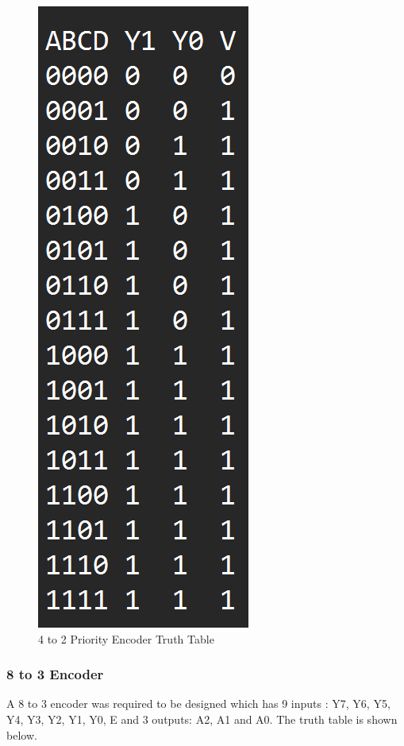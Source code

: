 \documentclass[12pt]{article}
\begin{document}
\begin{figure}[H]
\centering
  \includegraphics[scale=0.3]{Images/4to2PriorityTT.png}
  \caption{4 to 2 Priority Encoder Truth Table}
\end{figure}

\subsubsection{8 to 3 Encoder}
A 8 to 3 encoder was required to be designed which has 9 inputs : Y7, Y6, Y5, Y4, Y3, Y2, Y1, Y0, E and 3 outputs: A2, A1 and A0. The truth table is shown below.
\end{document}
